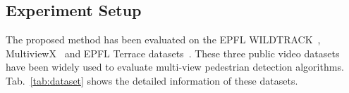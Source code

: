 \documentclass[runningheads]{llncs}
\begin{document}
	\subsection{Experiment Setup}
	The proposed method has been evaluated on the EPFL WILDTRACK~\cite{WILDTRACK_dataset}\cite{chavdarova2018wildtrack}, MultiviewX~\cite{MultiviewX_dataset}\cite{hou2020multiview} and EPFL Terrace datasets~\cite{Terrace_dataset}. These three public video datasets have been widely used to evaluate multi-view pedestrian detection algorithms. Tab.~\ref{tab:dataset} shows the detailed information of these datasets.
\begin{table}
		\begin{center}
			\caption{Datasets used for performance evaluation.}
			\label{tab:dataset}
		\end{center}		
	\end{table}
	
\end{document}
